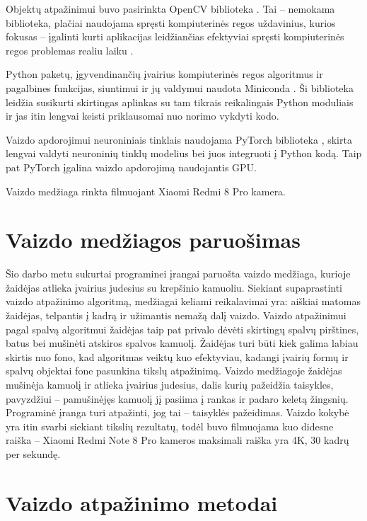 \documentclass{VUMIFPSbakalaurinis}
\begin{document}
Objektų atpažinimui buvo pasirinkta OpenCV biblioteka \cite{opencv}. Tai – nemokama biblioteka, plačiai naudojama spręsti kompiuterinės regos uždavinius, kurios fokusas – įgalinti kurti aplikacijas leidžiančias efektyviai spręsti kompiuterinės regos problemas realiu laiku \cite{BradskiOpenCV}.

Python paketų, įgyvendinančių įvairius kompiuterinės regos algoritmus ir pagalbines funkcijas, siuntimui ir jų valdymui naudota Miniconda \cite{conda}. Ši biblioteka leidžia susikurti skirtingas aplinkas su tam tikrais reikalingais Python moduliais ir jas itin lengvai keisti priklausomai nuo norimo vykdyti kodo.

Vaizdo apdorojimui neuroniniais tinklais naudojama PyTorch biblioteka \cite{pytorch}, skirta lengvai valdyti neuroninių tinklų modelius bei juos integruoti į Python kodą. Taip pat PyTorch įgalina vaizdo apdorojimą naudojantis GPU. 

Vaizdo medžiaga rinkta filmuojant Xiaomi Redmi 8 Pro kamera.  

\section{Vaizdo medžiagos paruošimas}

Šio darbo metu sukurtai programinei įrangai paruošta vaizdo medžiaga, kurioje žaidėjas atlieka įvairius judesius su krepšinio kamuoliu. Siekiant supaprastinti vaizdo atpažinimo algoritmą, medžiagai keliami reikalavimai yra: aiškiai matomas žaidėjas, telpantis į kadrą ir užimantis nemažą dalį vaizdo. Vaizdo atpažinimui pagal spalvą algoritmui žaidėjas taip pat privalo dėvėti skirtingų spalvų pirštines, batus bei mušinėti atskiros spalvos kamuolį. Žaidėjas turi būti kiek galima labiau skirtis nuo fono, kad algoritmas veiktų kuo efektyviau, kadangi įvairių formų ir spalvų objektai fone pasunkina tikslų atpažinimą. Vaizdo medžiagoje žaidėjas mušinėja kamuolį ir atlieka įvairius judesius, dalis kurių pažeidžia taisykles, pavyzdžiui – pamušinėjęs kamuolį jį pasiima į rankas ir padaro keletą žingsnių. Programinė įranga turi atpažinti, jog tai – taisyklės pažeidimas. Vaizdo kokybė yra itin svarbi siekiant tikslių rezultatų, todėl buvo filmuojama kuo didesne raiška – Xiaomi Redmi Note 8 Pro kameros maksimali raiška yra 4K, 30 kadrų per sekundę. 

\section{Vaizdo atpažinimo metodai}
\end{document}
